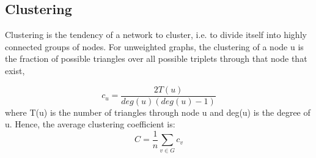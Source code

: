 \subsection{Clustering}
Clustering is the tendency of a network to cluster, i.e. to divide itself into highly connected groups of nodes.
For unweighted graphs, the clustering of a node u is the fraction of possible triangles over all possible triplets  through that node that exist,

$$
c_u = \frac{2 T(u)}{deg(u)(deg(u)-1)}
$$
where T(u) is the number of triangles through node u and deg(u) is the degree of u.
Hence, the average clustering coefficient is:
$$
C = \frac{1}{n}\sum_{v \in G} c_v
$$
